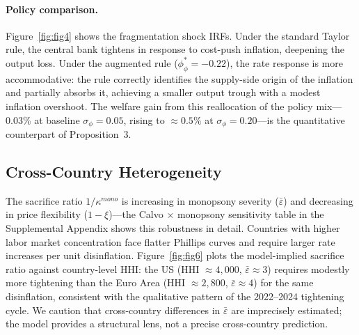 \paragraph{Policy comparison.}
Figure~\ref{fig:fig4} shows the fragmentation shock IRFs. Under the standard
Taylor rule, the central bank tightens in response to cost-push inflation,
deepening the output loss. Under the augmented rule ($\phi_\phi^* = -0.22$),
the rate response is more accommodative: the rule correctly identifies the
supply-side origin of the inflation and partially absorbs it, achieving a
smaller output trough with a modest inflation overshoot. The welfare gain from
this reallocation of the policy mix---0.03\% at baseline $\sigma_\phi = 0.05$,
rising to $\approx 0.5\%$ at $\sigma_\phi = 0.20$---is the quantitative
counterpart of Proposition~3.

\subsection{Cross-Country Heterogeneity}
\label{sec:exercise3}

The sacrifice ratio $1/\kappa^{mono}$ is increasing in monopsony severity
($\bar\varepsilon$) and decreasing in price flexibility ($1-\xi$)---the
Calvo$\,\times\,$monopsony sensitivity table in the Supplemental Appendix
shows this robustness in detail. Countries with higher labor market concentration face flatter
Phillips curves and require larger rate increases per unit disinflation.
Figure~\ref{fig:fig6} plots the model-implied sacrifice ratio against
country-level HHI: the US (HHI $\approx 4{,}000$, $\bar\varepsilon \approx 3$)
requires modestly more tightening than the Euro Area (HHI $\approx 2{,}800$,
$\bar\varepsilon \approx 4$) for the same disinflation, consistent with the
qualitative pattern of the 2022--2024 tightening cycle. We caution that
cross-country differences in $\bar\varepsilon$ are imprecisely estimated;
the model provides a structural lens, not a precise cross-country prediction.
